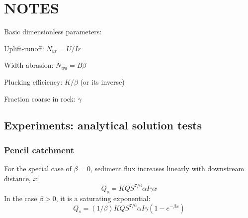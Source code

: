 \documentclass[journal abbreviation, manuscript]{copernicus}
\begin{document}
\authorcontribution{}



\begin{acknowledgements}
\end{acknowledgements}




\section*{NOTES}

Basic dimensionless parameters:

Uplift-runoff: $N_{ur} = U / I r$

Width-abrasion: $N_{wa} = B\beta$

Plucking efficiency: $K/\beta$ (or its inverse)

Fraction coarse in rock: $\gamma$


\subsection*{Experiments: analytical solution tests}

\subsubsection*{Pencil catchment}

For the special case of $\beta = 0$, sediment flux increases linearly with downstream distance, $x$:
\begin{equation}
    Q_s = K Q S^{7/6} \alpha I \gamma x
\end{equation}
In the case $\beta > 0$, it is a saturating exponential:
\begin{equation}
    Q_s = (1/\beta) K Q S^{7/6} \alpha I \gamma (1 - e^{-\beta x})
\end{equation}
\end{document}
